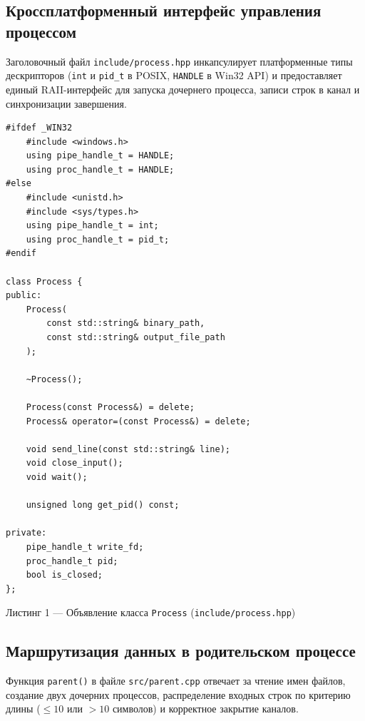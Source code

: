 \documentclass[11pt, a4paper]{article}
\begin{document}
\subsection{Кроссплатформенный интерфейс управления процессом}
Заголовочный файл \texttt{include/process.hpp} инкапсулирует платформенные типы дескрипторов (\texttt{int} и \texttt{pid\_t} в POSIX, \texttt{HANDLE} в Win32 API) и предоставляет единый RAII-интерфейс для запуска дочернего процесса, записи строк в канал и синхронизации завершения.

\begin{lstlisting}
#ifdef _WIN32
    #include <windows.h>
    using pipe_handle_t = HANDLE;
    using proc_handle_t = HANDLE;
#else
    #include <unistd.h>
    #include <sys/types.h>
    using pipe_handle_t = int;
    using proc_handle_t = pid_t;
#endif

class Process {
public:
    Process(
        const std::string& binary_path, 
        const std::string& output_file_path
    );

    ~Process();

    Process(const Process&) = delete;
    Process& operator=(const Process&) = delete;

    void send_line(const std::string& line);
    void close_input();
    void wait();

    unsigned long get_pid() const;

private:
    pipe_handle_t write_fd;
    proc_handle_t pid;
    bool is_closed;
};
\end{lstlisting}
\begin{center}
    \small Листинг 1 — Объявление класса \texttt{Process} (\texttt{include/process.hpp})
\end{center}

\subsection{Маршрутизация данных в родительском процессе}
Функция \texttt{parent()} в файле \texttt{src/parent.cpp} отвечает за чтение имен файлов, создание двух дочерних процессов, распределение входных строк по критерию длины ($\le 10$ или $> 10$ символов) и корректное закрытие каналов.
\end{document}
